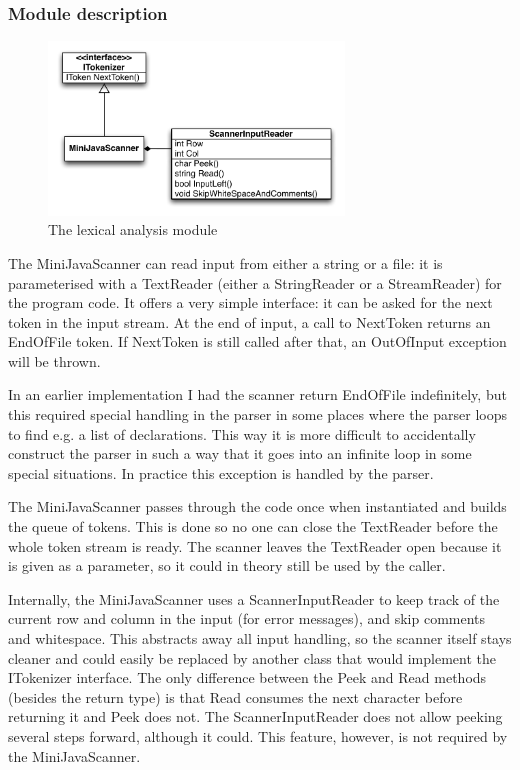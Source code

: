 \documentclass[a4paper,11pt]{article}
\begin{document}
\subsubsection{Module description}

\begin{figure}[h!]
\centering
\includegraphics[width=0.7\textwidth]{lexical_analysis.pdf}
\caption{The lexical analysis module}
\end{figure}

The MiniJavaScanner can read input from either a string or a file: it is parameterised with a TextReader (either a StringReader or a StreamReader) for the program code. It offers a very simple interface: it can be asked for the next token in the input stream. At the end of input, a call to NextToken returns an EndOfFile token. If NextToken is still called after that, an OutOfInput exception will be thrown.

In an earlier implementation I had the scanner return EndOfFile indefinitely, but this required special handling in the parser in some places where the parser loops to find e.g. a list of declarations. This way it is more difficult to accidentally construct the parser in such a way that it goes into an infinite loop in some special situations. In practice this exception is handled by the parser.

The MiniJavaScanner passes through the code once when instantiated and builds the queue of tokens. This is done so no one can close the TextReader before the whole token stream is ready. The scanner leaves the TextReader open because it is given as a parameter, so it could in theory still be used by the caller.

Internally, the MiniJavaScanner uses a ScannerInputReader to keep track of the current row and column in the input (for error messages), and skip comments and whitespace. This abstracts away all input handling, so the scanner itself stays cleaner and could easily be replaced by another class that would implement the ITokenizer interface. The only difference between the Peek and Read methods (besides the return type) is that Read consumes the next character before returning it and Peek does not. The ScannerInputReader does not allow peeking several steps forward, although it could. This feature, however, is not required by the MiniJavaScanner.
\end{document}
